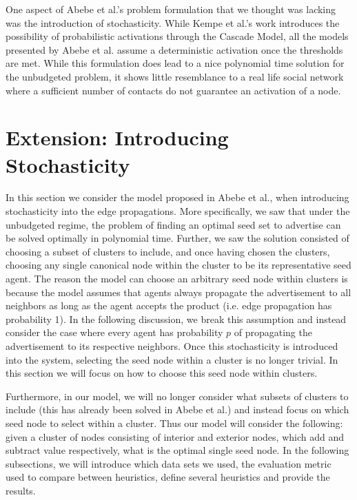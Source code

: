 \documentclass{article}
\begin{document}
One aspect of Abebe et al.'s problem formulation that we thought was lacking was the introduction of stochasticity. While Kempe et al.'s work introduces the possibility of probabilistic activations through the Cascade Model, all the models presented by Abebe et al. assume a deterministic activation once the thresholds are met. While this formulation does lead to a nice polynomial time solution for the unbudgeted problem, it shows little resemblance to a real life social network where a sufficient number of contacts do not guarantee an activation of a node. 




\section{Extension: Introducing Stochasticity}

In this section we consider the model proposed in Abebe et al., when introducing stochasticity into the edge propagations. More specifically, we saw that under the unbudgeted regime, the problem of finding an optimal seed set to advertise can be solved optimally in polynomial time. Further, we saw the solution consisted of choosing a subset of clusters to include, and once having chosen the clusters, choosing any single canonical node within the cluster to be its representative seed agent. The reason the model can choose an arbitrary seed node within clusters is because the model assumes that agents always propagate the advertisement to all neighbors as long as the agent accepts the product (i.e. edge propagation has probability 1). In the following discussion, we break this assumption and instead consider the case where every agent has probability $p$ of propagating the advertisement to its respective neighbors. Once this stochasticity is introduced into the system, selecting the seed node within a cluster is no longer trivial. In this section we will focus on how to choose this seed node within clusters.

Furthermore, in our model, we will no longer consider what subsets of clusters to include (this has already been solved in Abebe et al.) and instead focus on which seed node to select within a cluster. Thus our model will consider the following: given a cluster of nodes consisting of interior and exterior nodes, which add and subtract value respectively, what is the optimal single seed node. In the following subsections, we will introduce which data sets we used, the evaluation metric used to compare between heuristics, define several heuristics and provide the results. 
\end{document}
